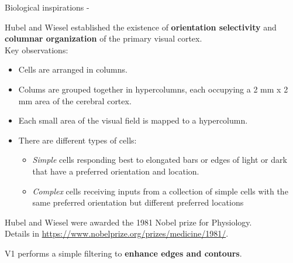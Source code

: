 \begin{frame}[t,allowframebreaks]{Biological inspirations - }
    \framebreak

    \gls{Hubel} and \gls{Wiesel} 
    established the existence of {\bf orientation selectivity} 
    and {\bf columnar organization} of the 
    \gls{primary visual cortex}.\\

    Key observations:
    \begin{itemize}
        \item Cells are arranged in columns.
        \item Colums are grouped together in hypercolumns, 
          each occupying a 2 mm x 2 mm area of the cerebral cortex.
        \item Each small area of the visual field is mapped to a hypercolumn.
        \item There are different types of cells:
        \begin{itemize}
            \item {\em Simple} cells responding best to elongated
               bars or edges of light or dark 
               that have a preferred orientation and location.
            \item {\em Complex} cells 
               receiving inputs from a collection of simple cells 
               with the same preferred orientation but 
               different preferred locations
        \end{itemize} 
    \end{itemize} 

    \begin{blockexample}{}
        \small
        \gls{Hubel} and \gls{Wiesel} were awarded the 1981 Nobel prize for Physiology.\\
        Details in \url{https://www.nobelprize.org/prizes/medicine/1981/}.
    \end{blockexample}

    \framebreak

    V1 performs a simple filtering to {\bf enhance edges and contours}.

\end{frame}
